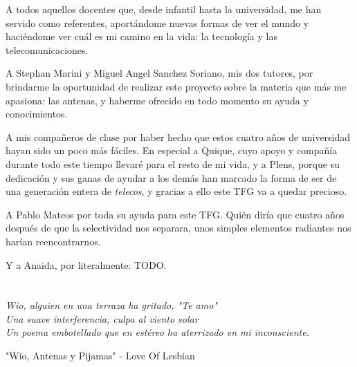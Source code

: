 \par A todos aquellos docentes que, desde infantil hasta la universidad, me han servido como referentes, aportándome nuevas formas de ver el mundo y haciéndome ver cuál es mi camino en la vida: la tecnología y las telecomunicaciones.




\par A Stephan Marini y Miguel Angel Sanchez Soriano, mis dos tutores, por brindarme la oportunidad de realizar este proyecto sobre la materia que más me apasiona: las antenas, y haberme ofrecido en todo momento su ayuda y conocimientos.




\par A mis compañeros de clase por haber hecho que estos cuatro años de universidad hayan sido un poco más fáciles. En especial a Quique, cuyo apoyo y compañía durante todo este tiempo llevaré para el resto de mi vida, y a Plens, porque su dedicación y sus ganas de ayudar a los demás han marcado la forma de ser de una generación entera de \textit{telecos}, y gracias a ello este TFG va a quedar precioso. 




\par A Pablo Mateos por toda su ayuda para este TFG. Quién diría que cuatro años después de que la selectividad nos separara, unos simples elementos radiantes nos harían reencontrarnos.




\par Y a Anaida, por literalmente: TODO. 
\cleardoublepage %
\chapter*{}
\setlength{\leftmargin}{0.5\textwidth}
\setlength{\parsep}{0cm}
\addtolength{\topsep}{0.5cm}
\begin{flushright}
\small\em{
Wio, alguien en una terraza ha gritado, "Te amo"\\
Una suave interferencia, culpa al viento solar\\
Un poema embotellado que en estéreo ha aterrizado en mi inconsciente.\\}
\end{flushright}


\begin{flushright}
\small{
"Wio, Antenas y Pijamas" - Love Of Lesbian
}
\end{flushright}


\cleardoublepage %


